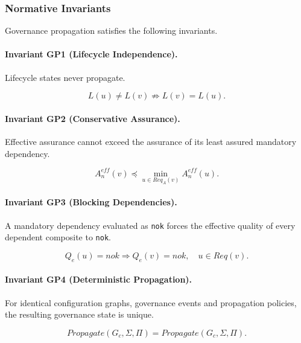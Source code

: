 \documentclass[10pt]{article}
\begin{document}
\subsubsection{Normative Invariants}

Governance propagation satisfies the following invariants.

\paragraph{Invariant GP1 (Lifecycle Independence).}

Lifecycle states never propagate.

\begin{equation}
L(u)\neq L(v)
\not\Rightarrow
L(v)=L(u).
\label{eq:gp1}
\end{equation}

\paragraph{Invariant GP2 (Conservative Assurance).}

Effective assurance cannot exceed the assurance of its least assured mandatory
dependency.

\begin{equation}
A_n^{eff}(v)
\preceq
\min_{u\in Req_A(v)}
A_n^{eff}(u).
\label{eq:gp2}
\end{equation}

\paragraph{Invariant GP3 (Blocking Dependencies).}

A mandatory dependency evaluated as
\texttt{nok}
forces the effective quality of every dependent composite to
\texttt{nok}.

\begin{equation}
Q_e(u)=nok
\Longrightarrow
Q_e(v)=nok,
\quad
u\in Req(v).
\label{eq:gp3}
\end{equation}

\paragraph{Invariant GP4 (Deterministic Propagation).}

For identical configuration graphs, governance events and propagation policies,
the resulting governance state is unique.

\begin{equation}
Propagate
(G_c,\Sigma,\Pi)
=
Propagate
(G_c,\Sigma,\Pi).
\label{eq:gp4}
\end{equation}
\end{document}
